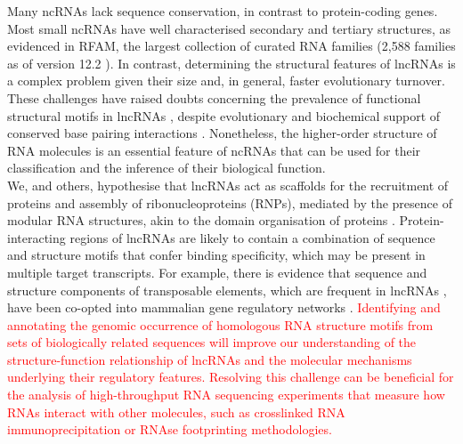 \documentclass{bmcart}
\begin{document}
Many ncRNAs lack sequence conservation, in contrast to protein-coding genes.
Most small ncRNAs have well characterised secondary and tertiary structures, as
evidenced in RFAM, the largest collection of curated RNA families (2,588
families as of version 12.2 \cite{rfam12}). In contrast, determining the
structural features of lncRNAs is a complex problem given their size and, in
general, faster evolutionary turnover. These challenges have raised doubts
concerning the prevalence of functional structural  motifs in lncRNAs
\cite{eddy2014computational,rivas2016statistical}, despite evolutionary and
biochemical support of conserved base pairing interactions
\cite{smith2013widespread,spitale2015structural,lu2016rna}.
Nonetheless, the higher-order structure of RNA molecules is an essential feature 
of ncRNAs that can be used for their classification and the inference of their biological function. \\

We, and others, hypothesise that lncRNAs act as scaffolds for the recruitment of proteins and assembly of
ribonucleoproteins (RNPs), mediated by the presence of modular RNA structures,
akin to the domain organisation of proteins
\cite{zappulla2006rna,hogg2008structured,rinn2012genome,mercer2013structure,smith2013widespread,chujo2016architectural,blythe2016ins}.
Protein-interacting regions of lncRNAs are likely to contain a combination of
sequence and structure motifs that confer binding specificity, which may 
be present in multiple target transcripts. For example, there is evidence that 
sequence and structure components of transposable elements, 
which are frequent in lncRNAs \cite{kapusta2013transposable,hezroni2015principles}, 
have been co-opted into mammalian gene regulatory networks \cite{kunarso2010transposable,kelley2012transposable}. 
\textcolor{red}{ Identifying and annotating the genomic occurrence of homologous 
RNA structure motifs from sets of biologically related sequences will improve our
understanding of the structure-function relationship of lncRNAs and the
molecular mechanisms underlying their regulatory features. Resolving this challenge 
can be beneficial for the analysis of high-throughput RNA sequencing experiments 
that measure how RNAs interact with other molecules, such as crosslinked 
RNA immunoprecipitation or RNAse footprinting methodologies.} \\
\end{document}
